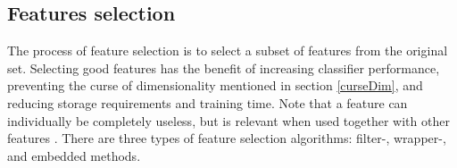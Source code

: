 \documentclass[USenglish]{ifimaster}  %
\begin{document}
	
	
	
\subsection{Features selection}\label{selection}	
The process of feature selection is to select a subset of features from the original set. Selecting good features has the benefit of increasing classifier performance, preventing the curse of dimensionality mentioned in section \ref{curseDim}, and reducing storage requirements and training time. Note that a feature can individually be completely useless, but is relevant when used together with other features \cite{Guyon2006}. There are three types of feature selection algorithms: filter-, wrapper-, and embedded methods. %
	

	
\end{document}
